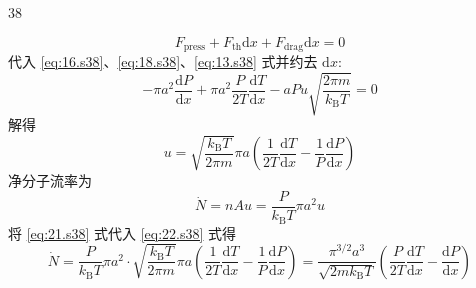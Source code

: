 \begin{solution}{38}
\begin{subsolution}
\begin{equation}
            F _ {\mathrm{press}} + F _ {\mathrm{th}} \mathrm{d} x + F _ {\mathrm{drag}} \mathrm{d} x = 0
            \label{eq:19.s38}
        \end{equation}
        代入 \eqref{eq:16.s38}、\eqref{eq:18.s38}、\eqref{eq:13.s38} 式并约去 $\mathrm{d}x$:
        \begin{equation}
            - \pi a ^ {2} \frac {\mathrm{d} P}{\mathrm{d} x} + \pi a ^ {2} \frac {P}{2 T} \frac {\mathrm{d} T}{\mathrm{d} x} - a P u \sqrt {\frac {2 \pi m}{k _ {\mathrm{B}} T}} = 0
            \label{eq:20.s38}
        \end{equation}
        解得
        \begin{equation}
            u = \sqrt {\frac {k _ {\mathrm{B}} T}{2 \pi m}} \pi a \left(\frac {1}{2 T} \frac {\mathrm{d} T}{\mathrm{d} x} - \frac {1}{P} \frac {\mathrm{d} P}{\mathrm{d} x}\right)
            \label{eq:21.s38}
        \end{equation}
        净分子流率为
        \begin{equation}
            \dot {N} = n A u = \frac {P}{k _ {\mathrm{B}} T} \pi a ^ {2} u
            \label{eq:22.s38}
        \end{equation}
        将 \eqref{eq:21.s38} 式代入 \eqref{eq:22.s38} 式得
        \begin{equation}
            \dot {N} = \frac {P}{k _ {\mathrm{B}} T} \pi a ^ {2} \cdot \sqrt {\frac {k _ {\mathrm{B}} T}{2 \pi m}} \pi a \left(\frac {1}{2 T} \frac {\mathrm{d} T}{\mathrm{d} x} - \frac {1}{P} \frac {\mathrm{d} P}{\mathrm{d} x}\right) = \frac {\pi^ {3 / 2} a ^ {3}}{\sqrt {2 m k _ {\mathrm{B}} T}} \left(\frac {P}{2 T} \frac {\mathrm{d} T}{\mathrm{d} x} - \frac {\mathrm{d} P}{\mathrm{d} x}\right)
            \label{eq:23.s38}
        \end{equation}
    \end{subsolution}
\end{solution}